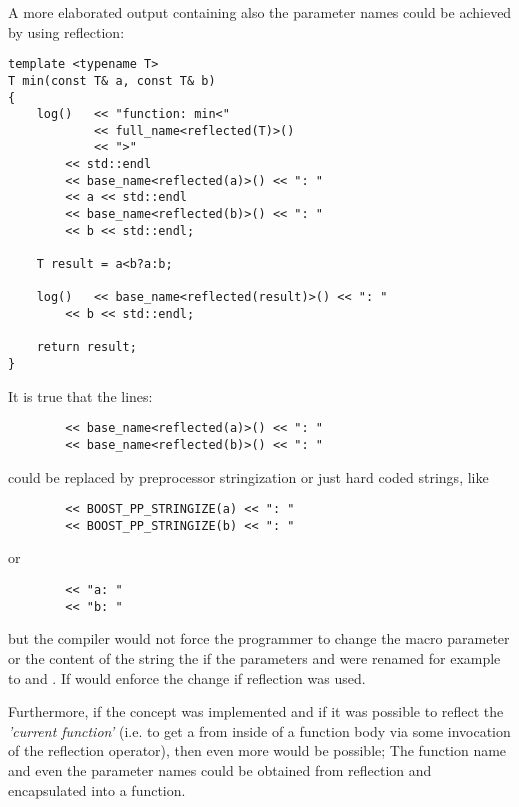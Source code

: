 A more elaborated output containing also the parameter names could be achieved
by using reflection:

\begin{verbatim}
template <typename T>
T min(const T& a, const T& b)
{
	log()   << "function: min<"
	        << full_name<reflected(T)>()
	        << ">"
		<< std::endl
		<< base_name<reflected(a)>() << ": "
		<< a << std::endl
		<< base_name<reflected(b)>() << ": "
		<< b << std::endl;

	T result = a<b?a:b;

	log()   << base_name<reflected(result)>() << ": "
		<< b << std::endl;

	return result;
}
\end{verbatim}

It is true that the lines:
\begin{verbatim}
		<< base_name<reflected(a)>() << ": "
		<< base_name<reflected(b)>() << ": "
\end{verbatim}

could be replaced by preprocessor stringization or just hard coded
strings, like

\begin{verbatim}
		<< BOOST_PP_STRINGIZE(a) << ": "
		<< BOOST_PP_STRINGIZE(b) << ": "
\end{verbatim}

or

\begin{verbatim}
		<< "a: "
		<< "b: "
\end{verbatim}

but the compiler would not force the programmer to change the macro parameter
or the content of the string the if the parameters \verb@a@ and \verb@b@ were renamed
for example to \verb@first@ and \verb@second@. If would enforce the change if
reflection was used.

Furthermore, if the  concept was implemented
and if it was possible to reflect the {\em 'current function'} (i.e. to get a 
from inside of a function body via some invocation of the reflection operator),
then even more would be possible; The function name and even the parameter names could
be obtained from reflection and encapsulated into a function.

